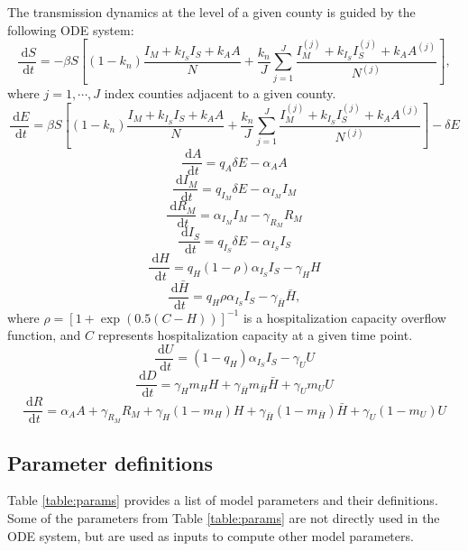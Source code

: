 \documentclass[11pt]{article}
\newcommand{\dx}[1]{\ \text{d} #1}
\newcommand{\comments}[1]{[\textcolor{red}{#1}]}
\begin{document}
The transmission dynamics at the level of a given county is guided by the following ODE system: \\
\[ \frac{\dx{S}}{\dx{t}} = -\beta S \left[ (1-k_n) \frac{ I_M + k_{I_S} I_S + k_A A}{N} + \frac{k_n}{J} \sum_{j=1}^J  \frac{I_M^{(j)} + k_{I_S} I_S^{(j)} + k_A A^{(j)}}{N^{(j)}} \right], \]
where $j = 1, \cdots , J$ index counties adjacent to a given county.
\[ \frac{\dx{E}}{\dx{t}} = \beta S \left[ (1-k_n) \frac{ I_M + k_{I_S} I_S + k_A A}{N} + \frac{k_n}{J} \sum_{j=1}^J  \frac{I_M^{(j)} + k_{I_S} I_S^{(j)} + k_A A^{(j)}}{N^{(j)}} \right] - \delta E \]
\[ \frac{\dx{A}}{\dx{t}} = q_A \delta E - \alpha_A A \]
\[ \frac{\dx{I_M}}{\dx{t}} = q_{I_M} \delta E - \alpha_{I_M} I_M \]
\[ \frac{\dx{R_M}}{\dx{t}} = \alpha_{I_M} I_M - \gamma_{R_M} R_M \]
\[ \frac{\dx{I_S}}{\dx{t}} = q_{I_S} \delta E - \alpha_{I_S} I_S \]
\[ \frac{\dx{H}}{\dx{t}} =  q_H (1 - \rho) \alpha_{I_S} I_S - \gamma_H H  \]
\[ \frac{\dx{\bar{H}}}{\dx{t}} =  q_H \rho \alpha_{I_S} I_S - \gamma_{\bar{H}} \bar{H},  \]
where $\rho = \left[ 1+\exp(0.5(C-H)) \right]^{-1}$ is a hospitalization capacity overflow function, and $C$ represents hospitalization capacity at a given time point.
\[ \frac{\dx{U}}{\dx{t}} =  (1 - q_H) \alpha_{I_S} I_S - \gamma_{U} U  \]
\[ \frac{\dx{D}}{\dx{t}} = \gamma_H m_H H + \gamma_{\bar{H}}  m_{\bar{H}} \bar{H} + \gamma_{U} m_{U} U \]
\[ \frac{\dx{R}}{\dx{t}} = \alpha_A A + \gamma_{R_M} R_M + \gamma_H (1-m_H) H + \gamma_{\bar{H}} (1 - m_{\bar{H}}) \bar{H} + \gamma_{U} (1- m_{U}) U  \]




\subsection{Parameter definitions}

Table \ref{table:params} provides a list of model parameters and their definitions. Some of the parameters from Table \ref{table:params} are not directly used in the ODE system, but are used as inputs to compute other model parameters. \\ 
\comments{Add the rest of parameters here, including intervention effects}
\end{document}

